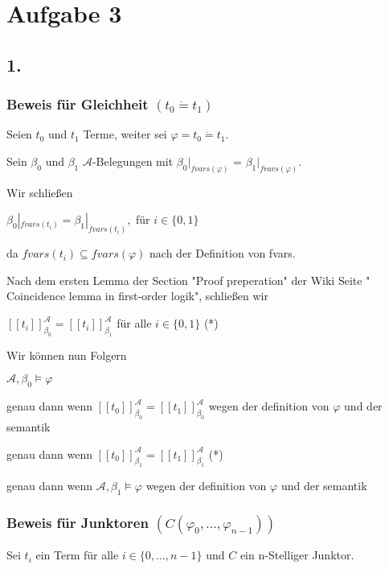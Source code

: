 \section*{Aufgabe 3}

\subsection*{1.}

\subsubsection*{Beweis für Gleichheit $(t_0 \dot= t_1)$}

Seien $t_0$ und $t_1$ Terme, weiter sei $\varphi = t_0 \dot= t_1$.

Sein $\beta_0$ und $\beta_1$ $\mathcal{A}$-Belegungen mit $\beta_0|_{fvars(\varphi)}$ = $\beta_1|_{fravs(\varphi)}$.

\hfill

Wir schließen

$\beta_0|_{fvars(t_i)} = \beta_1|_{fvars(t_i)},$ für $i \in \{0,1\}$ 

da $fvars(t_i) \subseteq fvars(\varphi)$ nach der Definition von fvars.

\hfill

Nach dem ersten Lemma der Section "Proof preperation" der Wiki Seite " Coincidence lemma in first-order logik",
schließen wir

$[\![ t_i ]\!]_{\beta_0}^\mathcal{A} = [\![ t_i ]\!]_{\beta_1}^\mathcal{A}$ für alle $i \in \{0,1\}$ (*)

\hfill

Wir können nun Folgern

$\mathcal{A},\beta_0 \vDash \varphi$ 

genau dann wenn $[\![ t_0 ]\!]_{\beta_0}^\mathcal{A} = [\![ t_1 ]\!]_{\beta_0}^\mathcal{A}$  wegen der definition von $\varphi$ und der semantik

genau dann wenn $[\![ t_0 ]\!]_{\beta_1}^\mathcal{A} = [\![ t_1 ]\!]_{\beta_1}^\mathcal{A}$ (*)

genau dann wenn $\mathcal{A},\beta_1 \vDash \varphi$ wegen der definition von $\varphi$ und der semantik

\subsubsection*{Beweis für Junktoren $(C(\varphi_0,...,\varphi_{n-1}))$ }

Sei $t_i$ ein Term für alle $i \in \{0,...,n-1\}$ und $C$ ein n-Stelliger Junktor.

